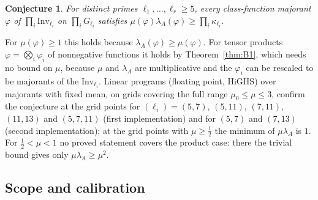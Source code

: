 \documentclass[11pt]{amsart}
\newtheorem{conjecture}[theorem]{Conjecture}
\theoremstyle{definition}
\theoremstyle{remark}
\newcommand{\Inv}{\mathrm{Inv}}
\begin{document}
\begin{conjecture}\label{conj:product}
For distinct primes $\ell_1,\dots,\ell_r\ge5$, every class-function majorant $\varphi$ of
$\prod_i\Inv_{\ell_i}$ on $\prod_iG_{\ell_i}$ satisfies $\mu(\varphi)\lambda_A(\varphi)\ge\prod_i\kappa_{\ell_i}$.
\end{conjecture}
For $\mu(\varphi)\ge1$ this holds because $\lambda_A(\varphi)\ge\mu(\varphi)$. For tensor products $\varphi=\bigotimes_i
\varphi_i$ of nonnegative functions it holds by Theorem~\ref{thm:B1}, which needs no bound on $\mu$, because $\mu$ and
$\lambda_A$ are multiplicative and the $\varphi_i$ can be rescaled to be majorants of the $\Inv_{\ell_i}$. Linear
programs (floating point, HiGHS) over majorants with fixed mean, on grids covering the full range $\mu_0\le\mu\le3$, confirm the conjecture
at the grid points for $(\ell_i)=(5,7)$, $(5,11)$, $(7,11)$, $(11,13)$ and $(5,7,11)$ (first implementation) and for
$(5,7)$ and $(7,13)$ (second implementation); at the grid points with $\mu\ge\frac12$ the minimum of
$\mu\lambda_A$ is $1$. For $\frac12<\mu<1$ no proved statement covers the product case: there the trivial bound
gives only $\mu\lambda_A\ge\mu^2$.

\subsection{Scope and calibration}\label{subsec:B-scope}
\end{document}
